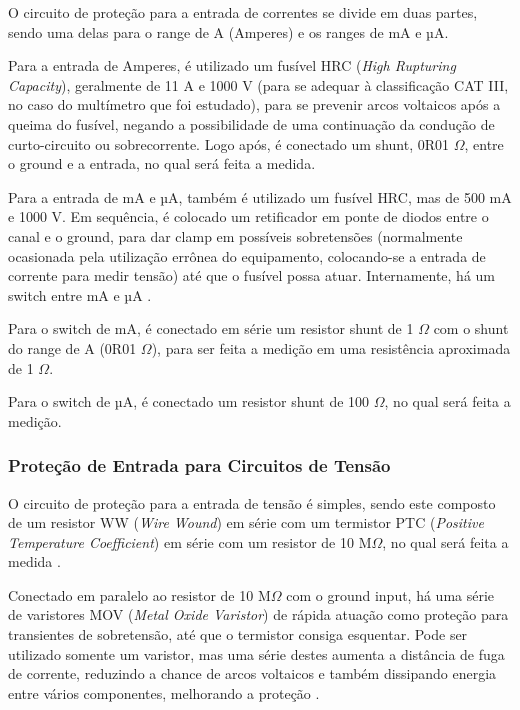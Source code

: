         O circuito de proteção para a entrada de correntes se divide em duas partes, sendo uma delas para o range de A (Amperes) e os ranges de mA e µA.

	    Para a entrada de Amperes, é utilizado um fusível \gls{HRC} (\textit{High Rupturing Capacity}), geralmente de 11 A e 1000 V (para se adequar à classificação CAT III, no caso do multímetro que foi estudado), para se prevenir arcos voltaicos após a queima do fusível, negando a possibilidade de uma continuação da condução de curto-circuito ou sobrecorrente. Logo após, é conectado um shunt, 0R01 $\Omega$, entre o ground e a entrada, no qual será feita a medida.

	    Para a entrada de mA e µA, também é utilizado um fusível \gls{HRC}, mas de 500 mA e 1000 V. Em sequência, é colocado um retificador em ponte de diodos entre o canal e o ground, para dar clamp em possíveis sobretensões (normalmente ocasionada pela utilização errônea do equipamento, colocando-se a entrada de corrente para medir tensão) até que o fusível possa atuar. Internamente, há um switch entre mA e µA \cite{fluke27manual}.

        Para o switch de mA, é conectado em série um resistor shunt de 1 $\Omega$ com o shunt do range de A (0R01 $\Omega$), para ser feita a medição em uma resistência aproximada de 1 $\Omega$.

        Para o switch de µA, é conectado um resistor shunt de 100 $\Omega$, no qual será feita a medição. \cite{IPblog}%

        \subsubsection{Proteção de Entrada para Circuitos de Tensão}\label{subsec:protecaoTensao}

        O circuito de proteção para a entrada de tensão é simples, sendo este composto de um resistor \gls{WW} (\textit{Wire Wound}) em série com um termistor \gls{PTC} (\textit{Positive Temperature Coefficient}) em série com um resistor de 10 M$\Omega$, no qual será feita a medida \cite{fluke27manual}.

        Conectado em paralelo ao resistor de 10 M$\Omega$ com o ground input, há uma série de varistores \gls{MOV} (\textit{Metal Oxide Varistor}) de rápida atuação como proteção para transientes de sobretensão, até que o termistor consiga esquentar. Pode ser utilizado somente um varistor, mas uma série destes aumenta a distância de fuga de corrente, reduzindo a chance de arcos voltaicos e também dissipando energia entre vários componentes, melhorando a proteção \cite{flukeblog}.

